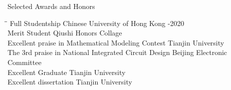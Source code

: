 
\begin{rSection}{Selected Awards and Honors}
\begin{tabbing}
\hspace{3.3in}\= \hspace{2.3in}\= \kill
    Full Studentship                      \> Chinese University of Hong Kong  -2020\\
    Merit Student                             \> Qiushi Honors Collage                       \\
    Excellent praise in Mathematical Modeling Contest                            \> Tianjin University                      \\
    The 3rd praise in National Integrated Circuit Design                 \>Beijing Electronic Committee                         \\
    Excellent Graduate                  \> Tianjin University                    \\
    Excellent dissertation                 \> Tianjin University                       \\
 \end{tabbing}
\end{rSection}

